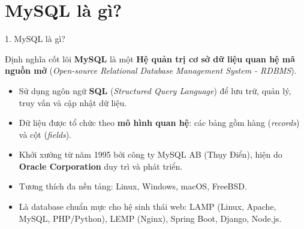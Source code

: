 \documentclass[aspectratio=169,11pt]{beamer}
\newcommand{\kw}[1]{\textcolor{dbblue}{\textbf{#1}}}
\newcommand{\smallgap}{\vspace{0.25em}}
\begin{document}
\section{MySQL là gì?}
\begin{frame}{1. MySQL là gì?}
\begin{block}{Định nghĩa cốt lõi}
  \textbf{MySQL} là một \kw{Hệ quản trị cơ sở dữ liệu quan hệ mã nguồn mở} (\textit{Open-source Relational Database Management System - RDBMS}).
\end{block}

\smallgap
\begin{itemize}\setlength{\itemsep}{3pt}
  \item Sử dụng ngôn ngữ \kw{SQL} (\textit{Structured Query Language}) để lưu trữ, quản lý, truy vấn và cập nhật dữ liệu.
  \item Dữ liệu được tổ chức theo \kw{mô hình quan hệ}: các bảng gồm hàng (\textit{records}) và cột (\textit{fields}).
  \item Khởi xướng từ năm 1995 bởi công ty MySQL AB (Thụy Điển), hiện do \kw{Oracle Corporation} duy trì và phát triển.
  \item Tương thích đa nền tảng: Linux, Windows, macOS, FreeBSD.
  \item Là database chuẩn mực cho hệ sinh thái web: LAMP (Linux, Apache, MySQL, PHP/Python), LEMP (Nginx), Spring Boot, Django, Node.js.
\end{itemize}
\end{frame}
\end{document}
